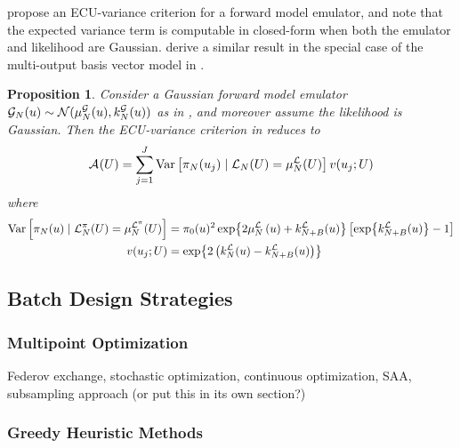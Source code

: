 \documentclass[12pt]{article}
\newtheorem{prop}{Proposition}
\begin{document}
\citet{SinsbeckNowak} propose an ECU-variance criterion for a forward model emulator, and note that 
the expected variance term is computable in closed-form when both the emulator and likelihood are Gaussian.
\citet{Surer2023sequential} derive a similar result in the special case of the multi-output basis vector 
model in .

\begin{prop} \label{prop:acq-intvar-fwd-Gaussian}
Consider a Gaussian forward model emulator 
$\fwdEm[\Ndesign](\Par) \sim \Gaussian(\emMean[\Ndesign]{\fwd}(\Par), \emKer[\Ndesign]{\fwd}(\Par))$
as in , and moreover assume the likelihood is Gaussian.
Then the ECU-variance criterion in  reduces to
\begin{equation}
\acq[](\parMat) = 
\sum_{j=1}^{J} \Var\left[\postEm(\Par_j) \given \llikEm(\parMat) = \emMean[\Ndesign]{\llik}(\parMat) \right] \varInflation(\Par_j; \parMat)   
\label{eq:acq-intvar-saa-ldens}
\end{equation}
where
\begin{align*}
\Var\left[\postEm(\Par) \given \lpostEm(\parMat) = \emMean[\Ndesign]{\lpost}(\parMat) \right]
&= \priorDens(\Par)^2 \Exp{2\emMean[\Ndesign]{\llik}\left(\Par\right) + \emKer[\Naugment]{\llik}(\Par)} 
\left[\Exp{\emKer[\Naugment]{\llik}(\Par)} - 1 \right] \\
\varInflation(\Par_j; \parMat)
&= \Exp{2\left(\emKer[\Ndesign]{\llik}(\Par) - \emKer[\Naugment]{\llik}(\Par)\right)}
\end{align*}
\end{prop}










\subsection{Batch Design Strategies}
\subsubsection{Multipoint Optimization}
Federov exchange, stochastic optimization, continuous optimization, SAA,
subsampling approach (or put this in its own section?)

\subsubsection{Greedy Heuristic Methods} \label{sec:batch-heuristic}
\end{document}
